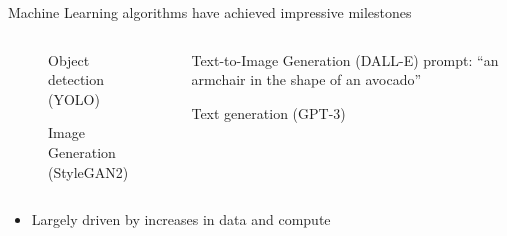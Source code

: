 \documentclass[8pt,xcolor=table]{beamer}
\begin{document}
\begin{frame}{Machine Learning algorithms have achieved impressive milestones}

\begin{columns}[t]
\begin{column}{0.5\textwidth}
\centering
\begin{figure}
\vspace{-2em}

 Object detection (YOLO)
 
 \vt
 
  Image Generation (StyleGAN2)
\end{figure}

\end{column}
\begin{column}{0.5\textwidth}
\centering
Text-to-Image Generation (DALL-E)
prompt: ``an armchair in the shape of an avocado''

\vspace{1.5em}

Text generation (GPT-3)
\end{column}

\end{columns}

\vo 

\begin{itemize}
 \item Largely driven by increases in data and compute
\end{itemize}

 
 
\end{frame}
\end{document}
